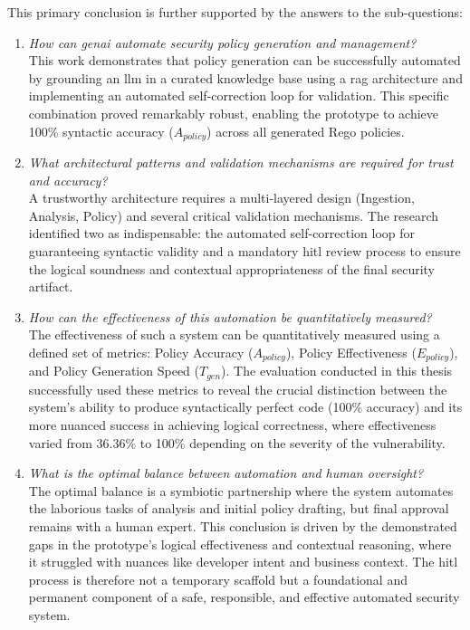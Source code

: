 This primary conclusion is further supported by the answers to the sub-questions:

\begin{enumerate}
    \item \textit{How can \gls{genai} automate security policy generation and management?} \\    This work demonstrates that policy generation can be successfully automated by grounding an \gls{llm} in a curated knowledge base using a \gls{rag} architecture and implementing an automated self-correction loop for validation. This specific combination proved remarkably robust, enabling the prototype to achieve 100\% syntactic accuracy (\(A_{policy}\)) across all generated Rego policies.

    \item \textit{What architectural patterns and validation mechanisms are required for trust and accuracy?} \\
    A trustworthy architecture requires a multi-layered design (Ingestion, Analysis, Policy) and several critical validation mechanisms. The research identified two as indispensable: the automated self-correction loop for guaranteeing syntactic validity and a mandatory \gls{hitl} review process to ensure the logical soundness and contextual appropriateness of the final security artifact.

    \item \textit{How can the effectiveness of this automation be quantitatively measured?} \\
    The effectiveness of such a system can be quantitatively measured using a defined set of metrics: Policy Accuracy (\(A_{policy}\)), Policy Effectiveness (\(E_{policy}\)), and Policy Generation Speed (\(T_{gen}\)). The evaluation conducted in this thesis successfully used these metrics to reveal the crucial distinction between the system's ability to produce syntactically perfect code (100\% accuracy) and its more nuanced success in achieving logical correctness, where effectiveness varied from 36.36\% to 100\% depending on the severity of the vulnerability.

    \item \textit{What is the optimal balance between automation and human oversight?} \\
    The optimal balance is a symbiotic partnership where the system automates the laborious tasks of analysis and initial policy drafting, but final approval remains with a human expert. This conclusion is driven by the demonstrated gaps in the prototype's logical effectiveness and contextual reasoning, where it struggled with nuances like developer intent and business context. The \gls{hitl} process is therefore not a temporary scaffold but a foundational and permanent component of a safe, responsible, and effective automated security system.
\end{enumerate}

